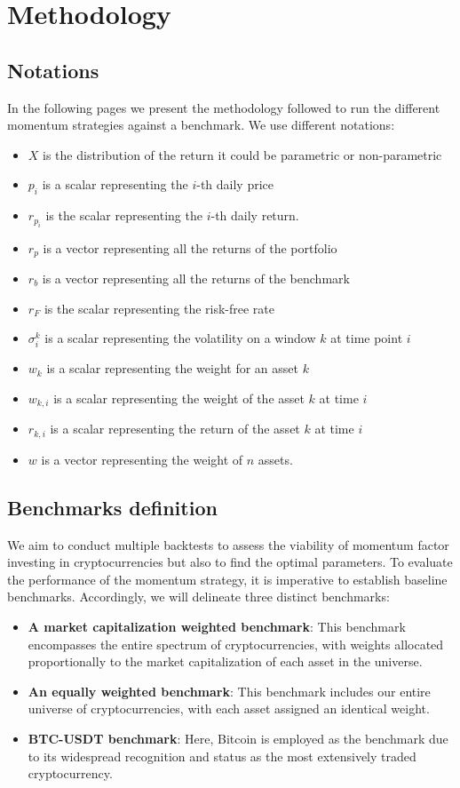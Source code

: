 \documentclass{article}
\begin{document}
\section{Methodology}
\subsection{Notations}
In the following pages we present the methodology followed to run the different momentum strategies against a benchmark. We use different notations:
\begin{itemize}
    \item $X$ is the distribution of the return it could be parametric or non-parametric
    \item $p_i$ is a scalar representing the $i$-th daily price
    \item $r_{p_i}$ is the scalar representing the $i$-th daily return.
    \item $r_p$ is a vector representing all the returns of the portfolio
    \item $r_b$ is a vector representing all the returns of the benchmark
    \item $r_F$ is the scalar representing the risk-free rate
    \item $\sigma_i^k$ is a scalar representing the volatility on a window $k$ at time point $i$
    \item $w_k$ is a scalar representing the weight for an asset $k$
    \item $w_{k,i}$ is a scalar representing the weight of the asset $k$ at time $i$
    \item $r_{k,i}$ is a scalar representing the return of the asset $k$ at time $i$
    \item $w$ is a vector representing the weight of $n$ assets.
\end{itemize}

\subsection{Benchmarks definition}\label{subsec:bench}
We aim to conduct multiple backtests to assess the viability of momentum factor investing in cryptocurrencies but also to find the optimal parameters. To evaluate the performance of the momentum strategy, it is imperative to establish baseline benchmarks. Accordingly, we will delineate three distinct benchmarks:
\begin{itemize}
    \item \textbf{A market capitalization weighted benchmark}: This benchmark encompasses the entire spectrum of cryptocurrencies, with weights allocated proportionally to the market capitalization of each asset in the universe.
    \item \textbf{An equally weighted benchmark}: This benchmark includes our entire universe of cryptocurrencies, with each asset assigned an identical weight.
    \item \textbf{BTC-USDT benchmark}: Here, Bitcoin is employed as the benchmark due to its widespread recognition and status as the most extensively traded cryptocurrency.
\end{itemize}
\end{document}

